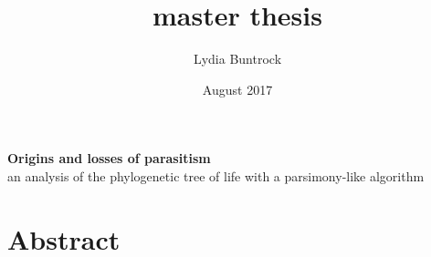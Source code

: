 
\author{Lydia Buntrock}
\title{master thesis}
\date{August 2017}


  \begin{titlepage}
    \pagestyle{empty}
  	
    	\vspace{20mm}
    	\begin{Large}
    	    \textbf{Origins and losses of parasitism}\\
          an analysis of the phylogenetic tree of life with a parsimony-like algorithm\\
    	\end{Large}

  	\clearpage
  \end{titlepage}

\chapter*{Abstract}

\tableofcontents
\clearpage

